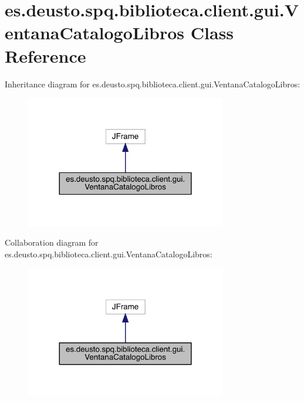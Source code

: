 \hypertarget{classes_1_1deusto_1_1spq_1_1biblioteca_1_1client_1_1gui_1_1_ventana_catalogo_libros}{}\section{es.\+deusto.\+spq.\+biblioteca.\+client.\+gui.\+Ventana\+Catalogo\+Libros Class Reference}
\label{classes_1_1deusto_1_1spq_1_1biblioteca_1_1client_1_1gui_1_1_ventana_catalogo_libros}


Inheritance diagram for es.\+deusto.\+spq.\+biblioteca.\+client.\+gui.\+Ventana\+Catalogo\+Libros\+:
\nopagebreak
\begin{figure}[H]
\begin{center}
\leavevmode
\includegraphics[width=248pt]{classes_1_1deusto_1_1spq_1_1biblioteca_1_1client_1_1gui_1_1_ventana_catalogo_libros__inherit__graph}
\end{center}
\end{figure}


Collaboration diagram for es.\+deusto.\+spq.\+biblioteca.\+client.\+gui.\+Ventana\+Catalogo\+Libros\+:
\nopagebreak
\begin{figure}[H]
\begin{center}
\leavevmode
\includegraphics[width=248pt]{classes_1_1deusto_1_1spq_1_1biblioteca_1_1client_1_1gui_1_1_ventana_catalogo_libros__coll__graph}
\end{center}
\end{figure}
